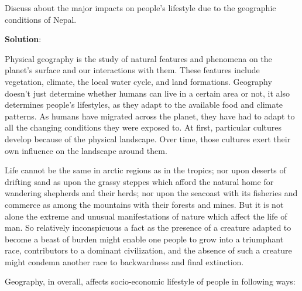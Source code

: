 \documentclass[
  openany]{book}
\newcommand{\question}{\item}
\newenvironment{solution}{ {\bfseries Solution}:}{}
\begin{document}
\begin{questions}

\question Discuss about the major impacts on people's lifestyle due to the geographic conditions of Nepal.

\begin{solution}

Physical geography is the study of natural features and phenomena on the planet's surface and our interactions with them. These features include vegetation, climate, the local water cycle, and land formations. Geography doesn't just determine whether humans can live in a certain area or not, it also determines people's lifestyles, as they adapt to the available food and climate patterns. As humans have migrated across the planet, they have had to adapt to all the changing conditions they were exposed to. At first, particular cultures develop because of the physical landscape. Over time, those cultures exert their own influence on the landscape around them.

Life cannot be the same in arctic regions as in the tropics; nor upon deserts of drifting sand as upon the grassy steppes which afford the natural home for wandering shepherds and their herds; nor upon the seacoast with its fisheries and commerce as among the mountains with their forests and mines. But it is not alone the extreme and unusual manifestations of nature which affect the life of man. So relatively inconspicuous a fact as the presence of a creature adapted to become a beast of burden might enable one people to grow into a triumphant race, contributors to a dominant civilization, and the absence of such a creature might condemn another race to backwardness and final extinction.

Geography, in overall, affects socio-economic lifestyle of people in following ways:


\end{solution}
\end{questions}
\end{document}
